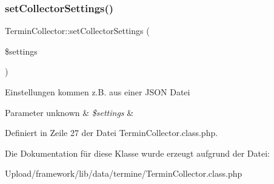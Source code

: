\subsubsection{\texorpdfstring{set\+Collector\+Settings()}{setCollectorSettings()}}
{\footnotesize\ttfamily Termin\+Collector\+::set\+Collector\+Settings (\begin{DoxyParamCaption}\item[{}]{\$settings }\end{DoxyParamCaption})}

Einstellungen kommen z.\+B. aus einer J\+S\+ON Datei 
\begin{DoxyParams}[1]{Parameter}
unknown & {\em \$settings} & \\
\hline
\end{DoxyParams}


Definiert in Zeile 27 der Datei Termin\+Collector.\+class.\+php.



Die Dokumentation für diese Klasse wurde erzeugt aufgrund der Datei\+:\begin{DoxyCompactItemize}
\item 
Upload/framework/lib/data/termine/Termin\+Collector.\+class.\+php\end{DoxyCompactItemize}
